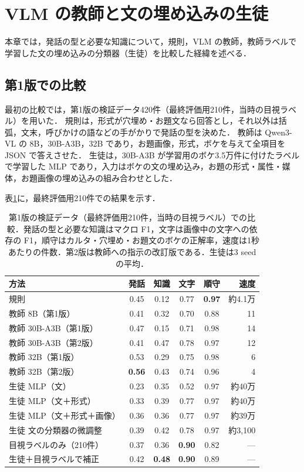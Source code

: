 \section{VLM の教師と文の埋め込みの生徒}
\label{sec_text}
本章では，発話の型と必要な知識について，規則，VLM の教師，教師ラベルで学習した文の埋め込みの分類器（生徒）を比較した経緯を述べる．

\subsection{第1版での比較}
最初の比較では，第1版の検証データ420件（最終評価用210件，当時の目視ラベル）を用いた．
規則は，形式が穴埋め・お題文なら回答とし，それ以外は括弧，文末，呼びかけの語などの手がかりで発話の型を決めた．
教師は Qwen3-VL の 8B，30B-A3B，32B であり，お題画像，形式，ボケを与えて全項目を JSON で答えさせた．
生徒は，30B-A3B が学習用のボケ3.5万件に付けたラベルで学習した MLP であり，入力はボケの文の埋め込み，お題の形式・属性・媒体，お題画像の埋め込みの組み合わせとした．

表\ref{tab_v1}に，最終評価用210件での結果を示す．

\begin{table}[t]
    \centering
    \caption{第1版の検証データ（最終評価用210件，当時の目視ラベル）での比較．発話の型と必要な知識はマクロ F1，文字は画像中の文字への依存の F1，順守はカルタ・穴埋め・お題文のボケの正解率，速度は1秒あたりの件数．第2版は教師への指示の改訂版である．生徒は3 seed の平均．}
    \label{tab_v1}
    \footnotesize
    \setlength{\tabcolsep}{2.5pt}
    \begin{tabular}{@{}lccccr@{}}
        \toprule
        方法 & 発話 & 知識 & 文字 & 順守 & 速度 \\
        \midrule
        規則 & 0.45 & 0.12 & 0.77 & \textbf{0.97} & 約4.1万 \\
        教師 8B（第1版） & 0.41 & 0.32 & 0.70 & 0.88 & 11 \\
        教師 30B-A3B（第1版） & 0.47 & 0.15 & 0.71 & 0.98 & 14 \\
        教師 30B-A3B（第2版） & 0.41 & 0.47 & 0.78 & 0.97 & 12 \\
        教師 32B（第1版） & 0.53 & 0.29 & 0.75 & 0.98 & 6 \\
        教師 32B（第2版） & \textbf{0.56} & 0.43 & 0.74 & 0.96 & 4 \\
        生徒 MLP（文） & 0.23 & 0.35 & 0.52 & 0.97 & 約40万 \\
        生徒 MLP（文＋形式） & 0.33 & 0.39 & 0.77 & 0.97 & 約40万 \\
        生徒 MLP（文＋形式＋画像） & 0.36 & 0.36 & 0.77 & 0.97 & 約39万 \\
        生徒 文の分類器の微調整 & 0.39 & 0.42 & 0.78 & 0.97 & 約3,100 \\
        目視ラベルのみ（210件） & 0.37 & 0.36 & \textbf{0.90} & 0.82 & --- \\
        生徒＋目視ラベルで補正 & 0.42 & \textbf{0.48} & \textbf{0.90} & 0.89 & --- \\
        \bottomrule
    \end{tabular}
\end{table}

